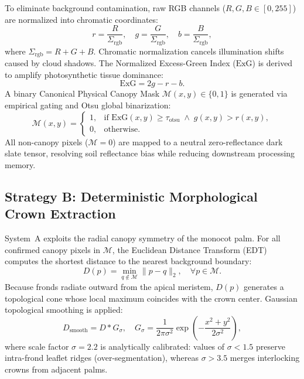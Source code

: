 \documentclass[conference,a4paper]{IEEEtran}
\begin{document}
To eliminate background contamination, raw RGB channels ($R, G, B \in [0, 255]$) are normalized into chromatic coordinates:
\begin{equation}
r = \frac{R}{\Sigma_{\text{rgb}}}, \quad g = \frac{G}{\Sigma_{\text{rgb}}}, \quad b = \frac{B}{\Sigma_{\text{rgb}}},
\label{eq:chromatic}
\end{equation}
where $\Sigma_{\text{rgb}} = R+G+B$. Chromatic normalization cancels illumination shifts caused by cloud shadows. The Normalized Excess-Green Index ($\text{ExG}$) is derived to amplify photosynthetic tissue dominance:
\begin{equation}
\text{ExG} = 2g - r - b.
\label{eq:exg}
\end{equation}
A binary Canonical Physical Canopy Mask $\mathcal{M}(x,y) \in \{0, 1\}$ is generated via empirical gating and Otsu global binarization:
\begin{equation}
\mathcal{M}(x,y) = 
\begin{cases}
1, & \text{if } \text{ExG}(x,y) \ge \tau_{\text{otsu}} \;\wedge\; g(x,y) > r(x,y), \\
0, & \text{otherwise}.
\end{cases}
\label{eq:canopy_mask}
\end{equation}
All non-canopy pixels ($\mathcal{M}=0$) are mapped to a neutral zero-reflectance dark slate tensor, resolving soil reflectance bias while reducing downstream processing memory.

\subsection{Strategy B: Deterministic Morphological Crown Extraction}
System~A exploits the radial canopy symmetry of the monocot palm. For all confirmed canopy pixels in $\mathcal{M}$, the Euclidean Distance Transform (EDT) computes the shortest distance to the nearest background boundary:
\begin{equation}
D(p) = \min_{q \notin \mathcal{M}} \|p - q\|_2, \quad \forall p \in \mathcal{M}.
\label{eq:edt}
\end{equation}
Because fronds radiate outward from the apical meristem, $D(p)$ generates a topological cone whose local maximum coincides with the crown center. Gaussian topological smoothing is applied:
\begin{equation}
D_{\text{smooth}} = D * G_\sigma, \quad G_\sigma = \frac{1}{2\pi\sigma^2} \exp\left(-\frac{x^2+y^2}{2\sigma^2}\right),
\label{eq:gaussian}
\end{equation}
where scale factor $\sigma = 2.2$ is analytically calibrated: values of $\sigma < 1.5$ preserve intra-frond leaflet ridges (over-segmentation), whereas $\sigma > 3.5$ merges interlocking crowns from adjacent palms.
\end{document}
